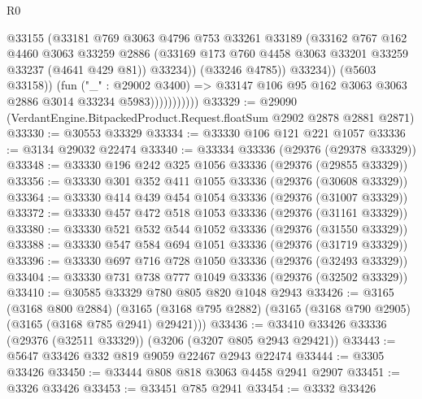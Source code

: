 \begin{lexlean}{R0}
\begin{coremodule}
                                @33155
                                (@33181
                                  @769
                                  @3063
                                  @4796
                                  @753
                                  @33261
                                  @33189
                                  (@33162
                                    @767
                                    @162
                                    @4460
                                    @3063
                                    @33259
                                    @2886
                                    (@33169
                                      @173
                                      @760
                                      @4458
                                      @3063
                                      @33201
                                      @33259
                                      @33237
                                      (@4641 @429 @81))
                                    @33234))
                                (@33246 @4785))
                              @33234))
                          (@5603 @33158))
                        (fun ("_" : @29002 @3400) =>
                        @33147 @106 @95 @162 @3063 @3063 @2886 @3014 @33234 @5983)))))))))))
@33329 := @29090 (VerdantEngine.BitpackedProduct.Request.floatSum @2902 @2878 @2881 @2871)
@33330 := @30553 @33329
@33334 := @33330 @106 @121 @221 @1057
@33336 := @3134 @29032 @22474
@33340 := @33334 @33336 (@29376 (@29378 @33329))
@33348 := @33330 @196 @242 @325 @1056 @33336 (@29376 (@29855 @33329))
@33356 := @33330 @301 @352 @411 @1055 @33336 (@29376 (@30608 @33329))
@33364 := @33330 @414 @439 @454 @1054 @33336 (@29376 (@31007 @33329))
@33372 := @33330 @457 @472 @518 @1053 @33336 (@29376 (@31161 @33329))
@33380 := @33330 @521 @532 @544 @1052 @33336 (@29376 (@31550 @33329))
@33388 := @33330 @547 @584 @694 @1051 @33336 (@29376 (@31719 @33329))
@33396 := @33330 @697 @716 @728 @1050 @33336 (@29376 (@32493 @33329))
@33404 := @33330 @731 @738 @777 @1049 @33336 (@29376 (@32502 @33329))
@33410 := @30585 @33329 @780 @805 @820 @1048 @2943
@33426 := @3165
    (@3168 @800 @2884)
    (@3165 (@3168 @795 @2882) (@3165 (@3168 @790 @2905) (@3165 (@3168 @785 @2941) @29421)))
@33436 := @33410 @33426 @33336 (@29376 (@32511 @33329)) (@3206 (@3207 @805 @2943 @29421))
@33443 := @5647 @33426 @332 @819 @9059 @22467 @2943 @22474
@33444 := @3305 @33426
@33450 := @33444 @808 @818 @3063 @4458 @2941 @2907
@33451 := @3326 @33426
@33453 := @33451 @785 @2941
@33454 := @3332 @33426

\end{coremodule}
\end{lexlean}
